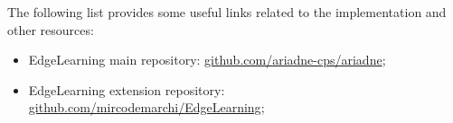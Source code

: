 The following list provides some useful links related to the implementation and other resources: 
\begin{itemize}
	\item EdgeLearning main repository: \href{https://github.com/ariadne-cps/ariadne}{github.com/ariadne-cps/ariadne};
	\item EdgeLearning extension repository: \href{https://github.com/mircodemarchi/EdgeLearning}{github.com/mircodemarchi/EdgeLearning};
\end{itemize}